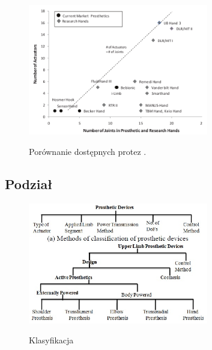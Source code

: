 \documentclass[8pt]{beamer}
\begin{document}
\begin{frame}%
	\begin{center}
		\begin{figure}
			\includegraphics[width=0.7\textwidth]{graphics/actuators_joints.png}
			\label{graph:hand}	
			\caption{Porównanie dostępnych protez \cite{belter2011performance}.}
		\end{figure}
	\end{center}

\end{frame}


	\subsection{Podział}
		\begin{frame}
			\begin{center}
				\begin{figure}
					\includegraphics[width=0.7\textwidth]{graphics/classification.jpg}
					\label{graph:class}	
					\caption{Klasyfikacja \cite{bandara2012upper}}
				\end{figure}
			\end{center}
		\end{frame}							
\end{document}
